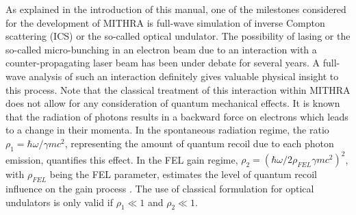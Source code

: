 As explained in the introduction of this manual, one of the milestones considered for the development of MITHRA is full-wave simulation of inverse Compton scattering (ICS) or the so-called optical undulator.
%
The possibility of lasing or the so-called micro-bunching in an electron beam due to an interaction with a counter-propagating laser beam has been under debate for several years.
%
A full-wave analysis of such an interaction definitely gives valuable physical insight to this process.
%
Note that the classical treatment of this interaction within MITHRA does not allow for any consideration of quantum mechanical effects.
%
It is known that the radiation of photons results in a backward force on electrons which leads to a change in their momenta.
%
In the spontaneous radiation regime, the ratio $\rho_1 = \hbar\omega/\gamma mc^2$, representing the amount of quantum recoil due to each photon emission, quantifies this effect.
%
In the FEL gain regime, $\rho_2 = (\hbar\omega/2 \rho_{FEL} \gamma mc^2)^2$, with $\rho_{FEL}$ being the FEL parameter, estimates the level of quantum recoil influence on the gain process \cite{bonifacio2006quantum,bonifacio2005quantum}.
%
The use of classical formulation for optical undulators is only valid if $\rho_1 \ll 1$ and $\rho_2 \ll 1$.

